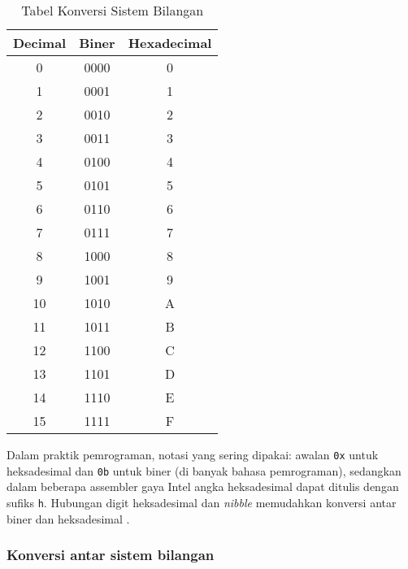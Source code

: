 \documentclass[../main.tex]{subfiles}
\begin{document}
                \begin{table}[H]
                    \centering
                    \caption{Tabel Konversi Sistem Bilangan}
                    \begin{tabular}{|c|c|c|}
                        \hline
                        \textbf{Decimal} & \textbf{Biner} & \textbf{Hexadecimal} \\
                        \hline
                        0 & 0000 & 0 \\
                        1 & 0001 & 1 \\
                        2 & 0010 & 2 \\
                        3 & 0011 & 3 \\
                        4 & 0100 & 4 \\
                        5 & 0101 & 5 \\
                        6 & 0110 & 6 \\
                        7 & 0111 & 7 \\
                        8 & 1000 & 8 \\
                        9 & 1001 & 9 \\
                        10 & 1010 & A \\
                        11 & 1011 & B \\
                        12 & 1100 & C \\
                        13 & 1101 & D \\
                        14 & 1110 & E \\
                        15 & 1111 & F \\
                        \hline
                    \end{tabular}
                    \label{tab:number-conversion}
                \end{table}

            Dalam praktik pemrograman, notasi yang sering dipakai: awalan \texttt{0x} untuk heksadesimal dan \texttt{0b} untuk biner (di banyak bahasa pemrograman), sedangkan dalam beberapa assembler gaya Intel angka heksadesimal dapat ditulis dengan sufiks \texttt{h}. Hubungan digit heksadesimal dan \textit{nibble} memudahkan konversi antar biner dan heksadesimal \cite{wiki_hexadecimal}.

        \subsubsection{Konversi antar sistem bilangan}
\end{document}
